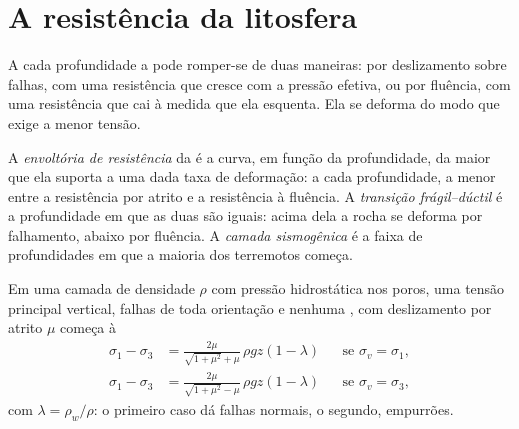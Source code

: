 \section{A resistência da litosfera}\label{sec:b1:stress-strain-rheology:envelope}

A cada profundidade a  pode romper-se de duas maneiras: por deslizamento sobre falhas, com uma resistência que cresce com a pressão efetiva, ou por fluência, com uma resistência que cai à medida que ela esquenta. Ela se deforma do modo que exige a menor tensão.

\begin{definition}\label{def:b1:stress-strain-rheology:strength-envelope}
A \emph{envoltória de resistência} da  é a curva, em função da profundidade, da maior  que ela suporta a uma dada taxa de deformação: a cada profundidade, a menor entre a resistência por atrito e a resistência à fluência. A \emph{transição frágil--dúctil} é a profundidade em que as duas são iguais: acima dela a rocha se deforma por falhamento, abaixo por fluência. A \emph{camada sismogênica} é a faixa de profundidades em que a maioria dos terremotos começa.
\end{definition}

\begin{proposition}\label{prop:b1:stress-strain-rheology:brittle-gradient}
Em uma camada de densidade $\rho$ com pressão hidrostática nos poros, uma tensão principal vertical, falhas de toda orientação e nenhuma , com deslizamento
por atrito $\mu$ começa à 
\begin{align*}
  \sigma_1 - \sigma_3 &= \frac{2\mu}{\sqrt{1+\mu^2} + \mu}\,\rho g z(1-\lambda)
  && \text{se $\sigma_v = \sigma_1$}, \\
  \sigma_1 - \sigma_3 &= \frac{2\mu}{\sqrt{1+\mu^2} - \mu}\,\rho g z(1-\lambda)
  && \text{se $\sigma_v = \sigma_3$},
\end{align*}
com $\lambda = \rho_w/\rho$: o primeiro caso dá falhas normais, o segundo, empurrões.
\end{proposition}

